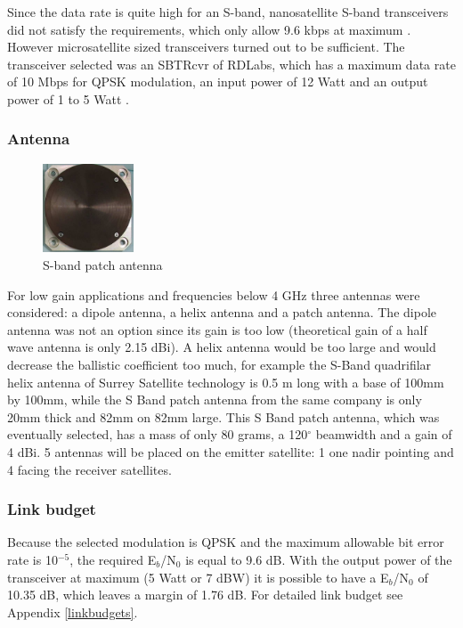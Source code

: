 Since the data rate is quite high for an S-band, nanosatellite S-band transceivers did not satisfy the requirements, which only allow 9.6 kbps at maximum \cite{cubeshopcomm}. However microsatellite sized transceivers turned out to be sufficient. The transceiver selected was an SBTRcvr of RDLabs, which has a maximum data rate of 10 Mbps for QPSK modulation, an input power of 12 Watt and an output power of 1 to 5 Watt \cite{RDLabs}.


\subsubsection{Antenna}
\begin{figure}
\vspace{-20pt}
  \begin{center}
    \includegraphics[width=0.24\textwidth]{chapters/img/spatch.png}
  \end{center}
  \vspace{-15pt}
  \caption{S-band patch antenna}
  \vspace{-10pt}
  \label{Spatch}
\end{figure}
For low gain applications and frequencies below 4 GHz three antennas were considered: a dipole antenna, a helix antenna and a patch antenna. The dipole antenna was not an option since its gain is too low (theoretical gain of a half wave antenna is only 2.15 dBi). A helix antenna would be too large and would decrease the ballistic coefficient too much, for example the S-Band quadrifilar helix antenna of Surrey Satellite technology \cite{SurrHelix} is 0.5 m long with a base of 100mm by 100mm, while the S Band patch antenna \cite{SurrPatch} from the same company is only 20mm thick and 82mm on 82mm large. 
This S Band patch antenna, which was eventually selected, has a mass of only 80 grams, a 120$^{\circ}$ beamwidth and a gain of 4 dBi.
5 antennas will be placed on the emitter satellite: 1 one nadir pointing and 4 facing the receiver satellites.

\subsubsection{Link budget}
Because the selected modulation is QPSK and the maximum allowable bit error rate is 10$^{-5}$, the required E$_{b}$/N$_{0}$ is equal to 9.6 dB. With the output power of the transceiver at maximum (5 Watt or 7 dBW) it is possible to have a E$_{b}$/N$_{0}$ of 10.35 dB, which leaves a margin of 1.76 dB. For detailed link budget see Appendix \ref{linkbudgets}.

